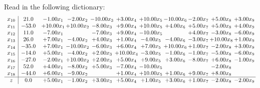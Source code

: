 \documentclass[9pt]{article}
\begin{document}
Read in the following dictionary:
\[\begin{array}{c| c c@{\hskip 2pt} c@{\hskip 2pt} c@{\hskip 2pt} c@{\hskip 2pt} c@{\hskip 2pt} c@{\hskip 2pt} c@{\hskip 2pt} c@{\hskip 2pt} c@{\hskip 2pt} }
 x_{10}   &  21.0 & -1.00 x_{1} & -2.00 x_{2} & -10.00 x_{3} & +  3.00 x_{4} & + 10.00 x_{5} & -10.00 x_{6} & -2.00 x_{7} & +  5.00 x_{8} & +  3.00 x_{9}\\
 x_{11}   &  -53.0 & + 10.00 x_{1} & + 10.00 x_{2} & -8.00 x_{3} & +  9.00 x_{4} & + 10.00 x_{5} & +  4.00 x_{6} & +  5.00 x_{7} & +  5.00 x_{8} & +  4.00 x_{9}\\
 x_{12}   &  11.0 & -7.00 x_{1} &   & -7.00 x_{3} & +  9.00 x_{4} & -10.00 x_{5} &   & +  4.00 x_{7} & -3.00 x_{8} & -6.00 x_{9}\\
 x_{13}   &  26.0 & +  7.00 x_{1} & -4.00 x_{2} & +  4.00 x_{3} & +  1.00 x_{4} & -4.00 x_{5} & -4.00 x_{6} & -3.00 x_{7} & + 10.00 x_{8} & +  1.00 x_{9}\\
 x_{14}   &  -35.0 & +  7.00 x_{1} & -10.00 x_{2} & -6.00 x_{3} & +  6.00 x_{4} & +  7.00 x_{5} & + 10.00 x_{6} & +  1.00 x_{7} & -2.00 x_{8} & +  3.00 x_{9}\\
 x_{15}   &  -14.0 & +  5.00 x_{1} & -4.00 x_{2} & +  2.00 x_{3} & + 10.00 x_{4} & -3.00 x_{5} & -1.00 x_{6} & -1.00 x_{7} & -5.00 x_{8} & -6.00 x_{9}\\
 x_{16}   &  -27.0 & -2.00 x_{1} & + 10.00 x_{2} & +  2.00 x_{3} & +  5.00 x_{4} & +  9.00 x_{5} & +  3.00 x_{6} & -8.00 x_{7} & +  6.00 x_{8} & -1.00 x_{9}\\
 x_{17}   &  52.0 & +  4.00 x_{1} & -8.00 x_{2} & +  5.00 x_{3} & -7.00 x_{4} & -10.00 x_{5} &    &   & -2.00 x_{8} &   \\
 x_{18}   &  -44.0 & +  6.00 x_{1} & -9.00 x_{2} &   & +  1.00 x_{4} & + 10.00 x_{5} & +  1.00 x_{6} & +  9.00 x_{7} & +  8.00 x_{8} &   \\
\hline
z    &  0.0 & +  5.00 x_{1} & -1.00 x_{2} & +  3.00 x_{3} & +  5.00 x_{4} & +  1.00 x_{5} & +  3.00 x_{6} & +  1.00 x_{7} & -2.00 x_{8} & -2.00 x_{9}\\
\end{array}\]
\end{document}
